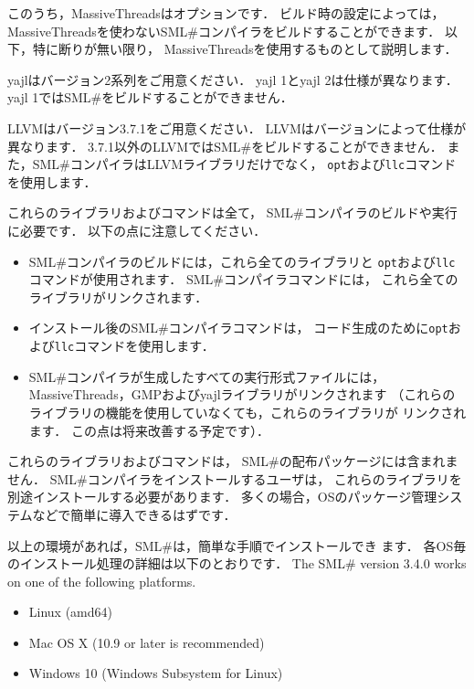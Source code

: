 \documentclass{jbook}
\newcommand{\smlsharp}{SML\#}
\newcommand{\version}{3.4.0}
\begin{document}
	このうち，MassiveThreadsはオプションです．
	ビルド時の設定によっては，
MassiveThreadsを使わない\smlsharp{}コンパイラをビルドすることができます．
	以下，特に断りが無い限り，
MassiveThreadsを使用するものとして説明します．

	yajlはバージョン2系列をご用意ください．
	yajl 1とyajl 2は仕様が異なります．
        yajl 1では\smlsharp{}をビルドすることができません．

	LLVMはバージョン3.7.1をご用意ください．
	LLVMはバージョンによって仕様が異なります．
	3.7.1以外のLLVMでは\smlsharp{}をビルドすることができません．
	また，\smlsharp{}コンパイラはLLVMライブラリだけでなく，
{\tt opt}および{\tt llc}コマンドを使用します．

	これらのライブラリおよびコマンドは全て，
\smlsharp{}コンパイラのビルドや実行に必要です．
	以下の点に注意してください．
\begin{itemize}
\item
	\smlsharp{}コンパイラのビルドには，これら全てのライブラリと
{\tt opt}および{\tt llc}コマンドが使用されます．
	\smlsharp{}コンパイラコマンドには，
これら全てのライブラリがリンクされます．
\item
	インストール後の\smlsharp{}コンパイラコマンドは，
コード生成のために{\tt opt}および{\tt llc}コマンドを使用します．
\item
	\smlsharp{}コンパイラが生成したすべての実行形式ファイルには，
MassiveThreads，GMPおよびyajlライブラリがリンクされます
（これらのライブラリの機能を使用していなくても，これらのライブラリが
リンクされます．
	この点は将来改善する予定です）．
\end{itemize}

	これらのライブラリおよびコマンドは，
\smlsharp{}の配布パッケージには含まれません．
	\smlsharp{}コンパイラをインストールするユーザは，
これらのライブラリを別途インストールする必要があります．
	多くの場合，OSのパッケージ管理システムなどで簡単に導入できるはずです．

	以上の環境があれば，\smlsharp{}は，簡単な手順でインストールでき
ます．
	各OS毎のインストール処理の詳細は以下のとおりです．
\else%
	The \smlsharp{} version \version{} works on one of the following
platforms.
\begin{itemize}
\item Linux (amd64)
\item Mac OS X (10.9 or later is recommended)
\item Windows 10 (Windows Subsystem for Linux)
\end{itemize}
\end{document}
